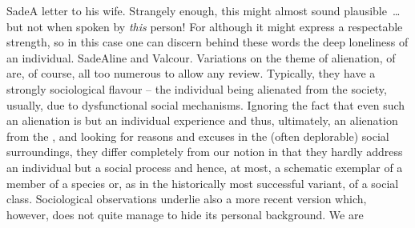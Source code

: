 \pa \citet{My manner of thinking, so you say, cannot be approved.  Do you
  suppose I care?  A poor fool indeed is he who adopts a manner of thinking for
  others!  My manner of thinking stems straight from my considered reflections;
  it holds with my existence, with the way I am made.  It is not in my power to
  alter it; and were it, I'd not do so.}{Sade}{A letter to his wife.} Strangely
enough, this might almost sound plausible~\ldots but not when spoken by {\em
  this} person! For although it might express a respectable strength, so in this
  case one can discern behind these words the deep
loneliness of an  individual.  \citet{All creatures are born isolated
  and have no need of one another.}{Sade}{Aline and Valcour.
  \label{ftnt:alienation}Variations on the theme of alienation, of  are, of course, all too numerous to allow
  any review. Typically, they have a strongly sociological flavour -- the
  individual being alienated from the society, usually, due to dysfunctional
  social mechanisms. Ignoring the fact
  that even such an alienation is but an individual experience and thus,
  ultimately, an alienation from the , and looking for reasons and
  excuses in the (often deplorable) social surroundings, they differ completely
  from our notion in that they hardly address an individual but a social process
  and hence, at most, a schematic exemplar of a member of a species or, as in
  the historically most successful variant, of a social class.
Sociological observations underlie also a more recent version which, however,
does not quite manage to hide its personal background.  We are
}
